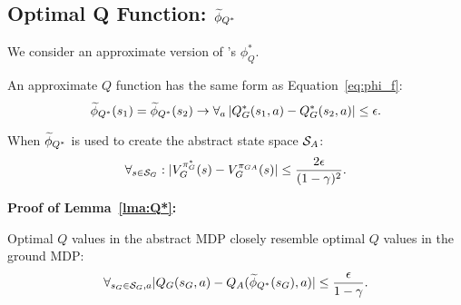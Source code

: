 


\subsection{Optimal Q Function: $\widetilde \phi_{Q^*}$}
\label{sec:Q*}

We consider an approximate version of \citeauthor{li2006towards}'s $\phi_Q^*$. 

\bdefn{$\epQ$}
An approximate $Q$ function has the same form as Equation~\ref{eq:phi_f}:
\begin{equation}
\widetilde \phi_{Q^*}(s_1) = \widetilde \phi_{Q^*}(s_2) \rightarrow \forall_a \left|Q_G^*(s_1, a) - Q_G^*(s_2, a)\right| \leq \epsilon.
\end{equation}
\edefn

\begin{lma}
\label{lma:Q*}
When $\widetilde \phi_{Q^*}$ is used to create the abstract state space $\mathcal{S}_A$:
\begin{equation}
\forall_{s \in \mathcal{S}_G}: | V_G^{\pi_G^*}(s) - V_G^{\pi_{GA}}(s) | \leq \frac{2\epsilon}{(1-\gamma)^2}.
\end{equation}
\end{lma}

\textbf{Proof of Lemma~\ref{lma:Q*}:}
\begin{clm}
\label{clm:closeQs}
Optimal $Q$ values in the abstract \ac{MDP} closely resemble optimal $Q$ values in the ground \ac{MDP}:
\begin{equation}
\label{eq:Q*Claim1}
\forall_{s_G \in \mathcal{S}_G, a} |Q_G(s_G, a) - Q_A(\widetilde \phi_{Q^*}(s_G), a)| \leq \frac{\epsilon}{1-\gamma}.
\end{equation}
\end{clm}

